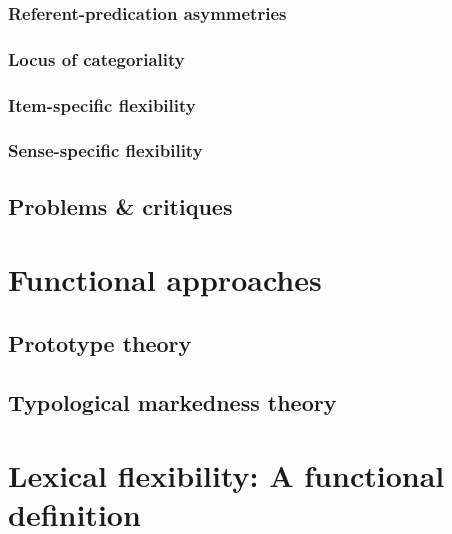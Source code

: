 \subsubsection{Referent-predication asymmetries}
\label{sec:2.3.2.2}

\subsubsection{Locus of categoriality}
\label{sec:2.3.2.3}

\subsubsection{Item-specific flexibility}
\label{sec:2.3.2.4}

\subsubsection{Sense-specific flexibility}
\label{sec:2.3.2.5}

\subsection{Problems \& critiques}
\label{sec:2.3.3}

\section{Functional approaches}
\label{sec:2.4}

\subsection{Prototype theory}
\label{sec:2.4.1}

\subsection{Typological markedness theory}
\label{sec:2.4.2}

\section{Lexical flexibility: A functional definition}
\label{sec:2.5}

